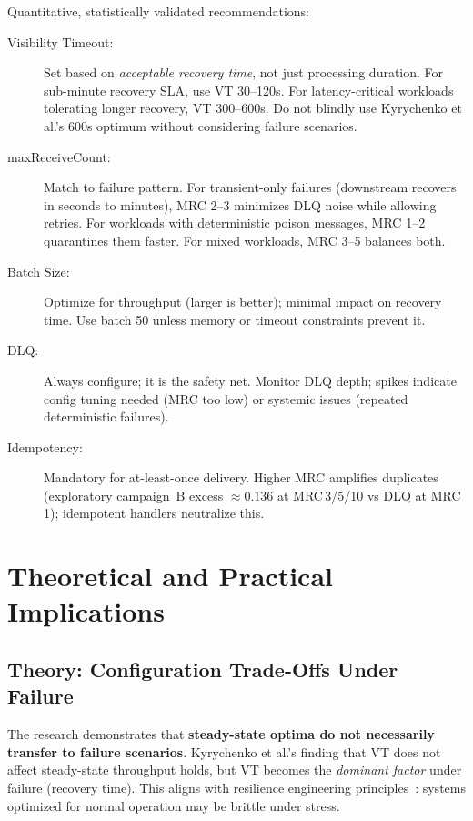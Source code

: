 Quantitative, statistically validated recommendations:

\begin{description}
    \item[Visibility Timeout:] Set based on \emph{acceptable recovery time}, not just processing duration. For sub-minute recovery SLA, use VT 30–120s. For latency-critical workloads tolerating longer recovery, VT 300–600s. Do not blindly use Kyrychenko et al.'s 600s optimum without considering failure scenarios.
    
    \item[maxReceiveCount:] Match to failure pattern. For transient-only failures (downstream recovers in seconds to minutes), MRC 2–3 minimizes DLQ noise while allowing retries. For workloads with deterministic poison messages, MRC 1–2 quarantines them faster. For mixed workloads, MRC 3–5 balances both.
    
    \item[Batch Size:] Optimize for throughput (larger is better); minimal impact on recovery time. Use batch 50 unless memory or timeout constraints prevent it.
    
    \item[DLQ:] Always configure; it is the safety net. Monitor DLQ depth; spikes indicate config tuning needed (MRC too low) or systemic issues (repeated deterministic failures).
    
    \item[Idempotency:] Mandatory for at-least-once delivery. Higher MRC amplifies duplicates (exploratory campaign~B excess $\approx0.136$ at MRC\,3/5/10 vs DLQ at MRC\,1); idempotent handlers neutralize this.
\end{description}

\section{Theoretical and Practical Implications}

\subsection{Theory: Configuration Trade-Offs Under Failure}

The research demonstrates that \textbf{steady-state optima do not necessarily transfer to failure scenarios}. Kyrychenko et al.'s finding that VT does not affect steady-state throughput holds, but VT becomes the \emph{dominant factor} under failure (recovery time). This aligns with resilience engineering principles~\citep{AWSResilience2023}: systems optimized for normal operation may be brittle under stress.

